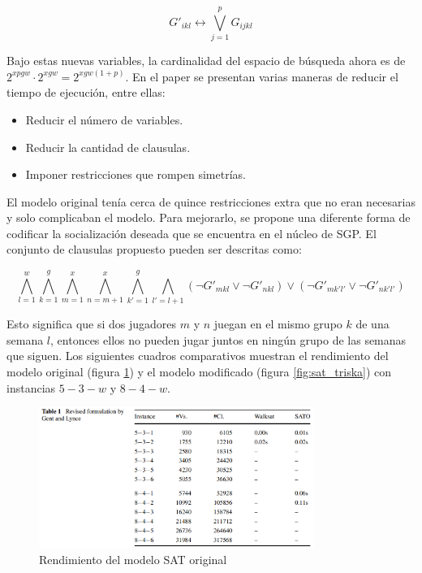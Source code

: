 \documentclass[letter, 10pt]{article}
\begin{document}
\begin{equation}
    G'_{ikl} \leftrightarrow \bigvee_{j=1}^p G_{ijkl}
\end{equation}

Bajo estas nuevas variables, la cardinalidad del espacio de búsqueda ahora es de $2^{xpgw}\cdot 2^{xgw}=2^{xgw(1+p)}$. En el paper se presentan varias maneras de reducir el tiempo de ejecución, entre ellas:
\begin{itemize}
    \item Reducir el número de variables.
    \item Reducir la cantidad de clausulas.
    \item Imponer restricciones que rompen simetrías.
\end{itemize}

El modelo original tenía cerca de quince restricciones extra que no eran necesarias y solo complicaban el modelo. Para mejorarlo, se propone una diferente forma de codificar la socialización deseada que se encuentra en el núcleo de SGP. El conjunto de clausulas propuesto pueden ser descritas como:

\begin{equation}
    \bigwedge_{l=1}^{w} \bigwedge_{k=1}^{g} \bigwedge_{m=1}^{x} \bigwedge_{n=m+1}^{x}
    \bigwedge_{k'=1}^g \bigwedge_{l'=l+1}
    (\neg G'_{mkl} \vee \neg G'_{nkl}) \vee (\neg G'_{mk'l'} \vee \neg G'_{nk'l'}) 
    \label{eq:8}    
\end{equation}

Esto significa que si dos jugadores $m$ y $n$ juegan en el mismo grupo $k$ de una semana $l$, entonces ellos no pueden jugar juntos en ningún grupo de las semanas que siguen. Los siguientes cuadros comparativos muestran el rendimiento del modelo original (figura \ref{fig:sat_original}) y el modelo modificado (figura \ref{fig:sat_triska}) con instancias $5-3-w$ y $8-4-w$.

\begin{figure}[h]
    \centering
    \includegraphics[width=0.8\textwidth]{figures/gent_lynceSAT.png}
    \caption{Rendimiento del modelo SAT original}
    \label{fig:sat_original}
\end{figure}
\end{document}
